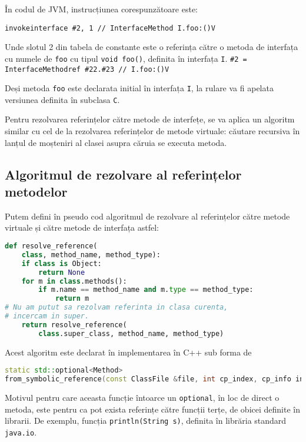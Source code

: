 În codul de JVM, instrucțiunea corespunzătoare este:

\texttt{invokeinterface \#2,  1            // InterfaceMethod I.foo:()V}

Unde slotul 2 din tabela de constante este o referința către o metoda de
interfața cu numele de \texttt{foo} cu tipul \texttt{void foo()}, definita în
interfața \texttt{I}.
\texttt{\#2 = InterfaceMethodref \#22.\#23        // I.foo:()V}

Deși metoda \texttt{foo} este declarata initial în interfața \texttt{I}, la
rulare va fi apelata versiunea definita în subclasa \texttt{C}.

Pentru rezolvarea referințelor către metode de interfețe, se va aplica un algoritm similar cu
cel de la rezolvarea referințelor de metode virtuale: căutare recursiva în
lanțul de moșteniri al clasei asupra căruia se executa metoda.

\subsection{Algoritmul de rezolvare al referințelor metodelor}

Putem defini în pseudo cod algoritmul de rezolvare al referințelor către metode
virtuale și către metode de interfața astfel:

\begin{lstlisting}[language=Python]
def resolve_reference(
    class, method_name, method_type):
    if class is Object:
        return None
    for m in class.methods():
        if m.name == method_name and m.type == method_type:
            return m
# Nu am putut sa rezolvam referinta in clasa curenta,
# incercam in super.
    return resolve_reference(
        class.super_class, method_name, method_type)
\end{lstlisting}

Acest algoritm este declarat în implementarea în C++ sub forma de

\begin{lstlisting}[language=C++]
static std::optional<Method>
from_symbolic_reference(const ClassFile &file, int cp_index, cp_info info);
\end{lstlisting}

Motivul pentru care aceasta funcție întoarce un \texttt{optional}, în loc de
direct o metoda, este pentru ca pot exista referințe către funcții terțe, de
obicei definite în librarii.
De exemplu, funcția \texttt{println(String s)}, definita în librăria standard
\texttt{java.io}.

